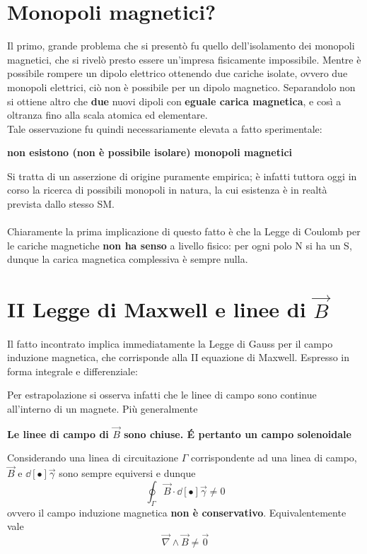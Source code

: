 \section{Monopoli magnetici?}
Il primo, grande problema che si presentò fu quello dell'isolamento dei monopoli magnetici, che si rivelò presto essere un'impresa fisicamente impossibile. Mentre è possibile rompere un dipolo elettrico ottenendo due cariche isolate, ovvero due monopoli elettrici, ciò non è possibile per un dipolo magnetico. Separandolo non si ottiene altro che \textbf{due} nuovi dipoli con \textbf{eguale carica magnetica}, e così a oltranza fino alla scala atomica ed elementare.
\\Tale osservazione fu quindi necessariamente elevata a fatto sperimentale:
\begin{center}
\textbf{non esistono (non è possibile isolare) monopoli magnetici}
\end{center}
Si tratta di un asserzione di origine puramente empirica; è infatti tuttora oggi in corso la ricerca di possibili monopoli in natura, la cui esistenza è in realtà prevista dallo stesso SM.
\\~\\
Chiaramente la prima implicazione di questo fatto è che la Legge di Coulomb per le cariche magnetiche \textbf{non ha senso} a livello fisico: per ogni polo N si ha un S, dunque la carica magnetica complessiva è sempre nulla.

\section{II Legge di Maxwell e linee di $\vec{B}$}
Il fatto incontrato implica immediatamente la Legge di Gauss per il campo induzione magnetica, che corrisponde alla II equazione di Maxwell. Espresso in forma integrale e differenziale:


Per estrapolazione si osserva infatti che le linee di campo sono continue all'interno di un magnete. Più generalmente
\begin{center}
\textbf{Le linee di campo di $\vec{B}$ sono chiuse. \'E pertanto un campo solenoidale}
\end{center}

Considerando una linea di circuitazione $\Gamma$ corrispondente ad una linea di campo, $\vec{B}$ e $\dd[•]{\vec{\gamma}}$ sono sempre equiversi e dunque 
\[\oint_\Gamma \vec{B} \cdot \dd[•]{\vec{\gamma}} \neq 0\] 
ovvero il campo induzione magnetica \textbf{non è conservativo}. Equivalentemente vale
\[\vec{\nabla} \wedge \vec{B} \neq \vec{0}\]

